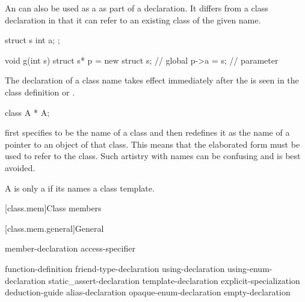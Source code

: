 \pnum
{}%
%
\begin{note}
An  can also
be used as a  as part of a declaration. It
differs from a class declaration in that it can refer to
an existing class of the given name.
\end{note}
\begin{example}
\begin{codeblock}
struct s { int a; };

void g(int s) {
  struct s* p = new struct s;   // global 
  p->a = s;                     // parameter 
}
\end{codeblock}
\end{example}

\pnum
{}%
\begin{note}
The declaration of a class name takes effect immediately after the
 is seen in the class definition or
.
\begin{example}
\begin{codeblock}
class A * A;
\end{codeblock}
first specifies  to be the name of a class and then redefines
it as the name of a pointer to an object of that class. This means that
the elaborated form   must be used to refer to the
class. Such artistry with names can be confusing and is best avoided.
\end{example}
\end{note}

\pnum
{}%
A  is only a 
if its  names a class template.

[class.mem]{Class members}%

[class.mem.general]{General}%
%

\begin{bnf}
\br
    member-declaration \br
    access-specifier \terminal{:} 
\end{bnf}

\begin{bnf}
\br
       \terminal{;}\br
    function-definition\br
    friend-type-declaration\br
    using-declaration\br
    using-enum-declaration\br
    static_assert-declaration\br
    template-declaration\br
    explicit-specialization\br
    deduction-guide\br
    alias-declaration\br
    opaque-enum-declaration\br
    empty-declaration
\end{bnf}

